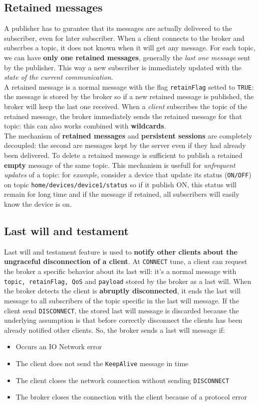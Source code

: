 \documentclass[10pt,a4paper]{report}
\theoremstyle{definition}
\begin{document}
\subsection{Retained messages}\label{sec:retained-messages}
A publisher has to gurantee that its messages are actually delivered to the subscriber, even for later subscriber. When a client connects to the broker and subscrbes a topic, it does not known when it will get any message. For each topic, we can have \textbf{only one retained messages}, generally the \textit{last one message} sent by the publisher. This way a new subscriber is immediately updated with the \textit{state of the current communication}.\\
A retained message is a normal message with the flag \texttt{retainFlag} setted to \texttt{TRUE}: the message is stored by the broker so if a new retained message is published, the broker will keep the last one received.
When a \textit{client} subscribes the topic of the retained message, the broker immediately sends the retained message for that topic: this can also works combined with \textbf{wildcards}.\\
The mechanism of \textbf{retained messages} and \textbf{persistent sessions} are completely decoupled: the second are messages kept by the server even if they had already been delivered. To delete a retained message is sufficient to publish a retained \textbf{empty} message of the same topic. This mechanism is usefull for \textit{unfrequent updates} of a topic: for \textit{example}, consider a device that update its status (\texttt{ON/OFF}) on topic \texttt{home/devices/device1/status} so if it publish ON, this status will remain for long time and if the message if retained, all subscribers will easily know the device is on.
\subsection{Last will and testament}\label{sec:last-will-and-testament}
Last will and testament feature is used to \textbf{notify other clients about the ungraceful disconnection of a client}. At \texttt{CONNECT} tune, a client can request the broker a specific behavior about its last will: it's a normal message with \texttt{topic, retainFlag, QoS} and \texttt{payload} stored by the broker as a last will.
When the broker detects the client is \textbf{abruptly disconnected}, it ends the last will message to all subscribers of the topic specific in the last will message. If the client send \texttt{DISCONNECT}, the stored last will message is discarded because the underlying assumption is that before correctly disconnect the clients has been already notified other clients.
So, the broker sends a last will message if:
\begin{itemize}
	\item 
	Occurs an IO Network error
	\item 
	The client does not send the \texttt{KeepAlive} message in time
	\item 
	The client closes the network connection without sending \texttt{DISCONNECT}
	\item 
	The broker closes the connection with the client because of a protocol error
\end{itemize}
\end{document}
